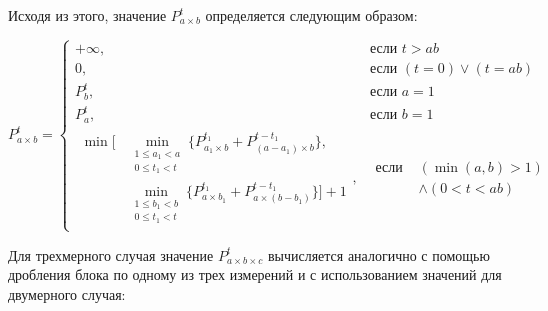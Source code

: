 Исходя из этого, значение $P_{a \times b}^t$ определяется следующим образом:

\begin{equation}\label{eqn:par_pnmt_2d}
P_{a \times b}^t =
	\begin{cases}
		+\infty, & \text{если } t > ab \\
		0, & \text{если } (t = 0) \vee (t = ab) \\
		P_b^t, & \text{если } a = 1 \\
		P_a^t, & \text{если } b = 1 \\
		\begin{aligned}
			\min\big[
				& \min_{\substack{1 \le a_1 < a \\ 0 \le t_1 < t}}{\{P_{a_1 \times b}^{t_1} + P_{(a - a_1) \times b}^{t - t_1}\}}, \\[-8pt]
				& \min_{\substack{1 \le b_1 < b \\ 0 \le t_1 < t}}{\{P_{a \times b_1}^{t_1} + P_{a \times (b - b_1)}^{t - t_1}\}}
			\big] + 1
		\end{aligned}, &
			\begin{aligned}
				\text{если } & (\min(a, b) > 1) \\[-10pt]
				& \wedge (0 < t < ab)
			\end{aligned}
	\end{cases}
\end{equation}

Для трехмерного случая значение $P_{a \times b \times c}^t$ вычисляется аналогично с помощью дробления блока по одному из трех измерений и с использованием значений для двумерного случая:

